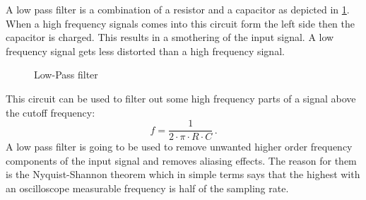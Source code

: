A low pass filter is a combination of a resistor and a capacitor as depicted in \cref{fig_lowpass}. When a high frequency signals comes into this circuit form the left side then the capacitor is charged. This results in a smothering of the input signal. A low frequency signal gets less distorted than a high frequency signal.

\begin{figure}[htb]
	\centering
	\caption{Low-Pass filter}
	\label{fig_lowpass}
\end{figure}

This circuit can be used to filter out some high frequency parts of a signal above the cutoff frequency:
\[
f = \frac{1}{2 \cdot \pi \cdot R \cdot C}\,.
\]
A low pass filter is going to be used to remove unwanted higher order frequency components of the input signal and removes aliasing effects. The reason for them is the Nyquist-Shannon theorem which in simple terms says that the highest with an oscilloscope measurable frequency is half of the sampling rate.
